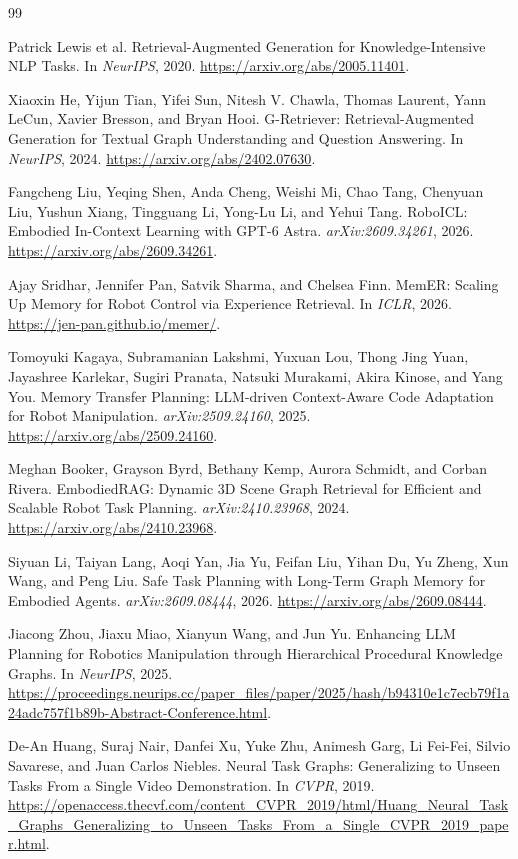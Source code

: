 \begin{thebibliography}{99}

Patrick Lewis et al.
Retrieval-Augmented Generation for Knowledge-Intensive NLP Tasks.
In \emph{NeurIPS}, 2020.
\url{https://arxiv.org/abs/2005.11401}.

Xiaoxin He, Yijun Tian, Yifei Sun, Nitesh V. Chawla, Thomas Laurent, Yann LeCun, Xavier Bresson, and Bryan Hooi.
G-Retriever: Retrieval-Augmented Generation for Textual Graph Understanding and Question Answering.
In \emph{NeurIPS}, 2024.
\url{https://arxiv.org/abs/2402.07630}.

Fangcheng Liu, Yeqing Shen, Anda Cheng, Weishi Mi, Chao Tang, Chenyuan Liu, Yushun Xiang, Tingguang Li, Yong-Lu Li, and Yehui Tang.
RoboICL: Embodied In-Context Learning with GPT-6 Astra.
\emph{arXiv:2609.34261}, 2026.
\url{https://arxiv.org/abs/2609.34261}.

Ajay Sridhar, Jennifer Pan, Satvik Sharma, and Chelsea Finn.
MemER: Scaling Up Memory for Robot Control via Experience Retrieval.
In \emph{ICLR}, 2026.
\url{https://jen-pan.github.io/memer/}.

Tomoyuki Kagaya, Subramanian Lakshmi, Yuxuan Lou, Thong Jing Yuan, Jayashree Karlekar, Sugiri Pranata, Natsuki Murakami, Akira Kinose, and Yang You.
Memory Transfer Planning: LLM-driven Context-Aware Code Adaptation for Robot Manipulation.
\emph{arXiv:2509.24160}, 2025.
\url{https://arxiv.org/abs/2509.24160}.

Meghan Booker, Grayson Byrd, Bethany Kemp, Aurora Schmidt, and Corban Rivera.
EmbodiedRAG: Dynamic 3D Scene Graph Retrieval for Efficient and Scalable Robot Task Planning.
\emph{arXiv:2410.23968}, 2024.
\url{https://arxiv.org/abs/2410.23968}.

Siyuan Li, Taiyan Lang, Aoqi Yan, Jia Yu, Feifan Liu, Yihan Du, Yu Zheng, Xun Wang, and Peng Liu.
Safe Task Planning with Long-Term Graph Memory for Embodied Agents.
\emph{arXiv:2609.08444}, 2026.
\url{https://arxiv.org/abs/2609.08444}.

Jiacong Zhou, Jiaxu Miao, Xianyun Wang, and Jun Yu.
Enhancing LLM Planning for Robotics Manipulation through Hierarchical Procedural Knowledge Graphs.
In \emph{NeurIPS}, 2025.
\url{https://proceedings.neurips.cc/paper_files/paper/2025/hash/b94310e1c7ecb79f1a24adc757f1b89b-Abstract-Conference.html}.

De-An Huang, Suraj Nair, Danfei Xu, Yuke Zhu, Animesh Garg, Li Fei-Fei, Silvio Savarese, and Juan Carlos Niebles.
Neural Task Graphs: Generalizing to Unseen Tasks From a Single Video Demonstration.
In \emph{CVPR}, 2019.
\url{https://openaccess.thecvf.com/content_CVPR_2019/html/Huang_Neural_Task_Graphs_Generalizing_to_Unseen_Tasks_From_a_Single_CVPR_2019_paper.html}.


\end{thebibliography}
